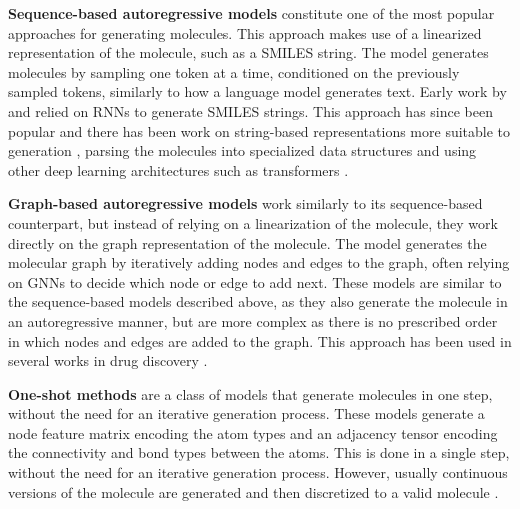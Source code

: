 \textbf{Sequence-based autoregressive models} constitute one of the most popular approaches for
generating molecules. This approach makes use of a linearized representation of the molecule, such
as a SMILES string. The model generates molecules by sampling one token at a time,
conditioned on the previously sampled tokens, similarly to how a language model generates text.
Early work by \citep{seglerGeneratingFocusedMolecule2018} and
\citep{gomez-bombarelliAutomaticChemicalDesign2018} relied on \acp{RNN} to
generate SMILES strings. This approach has since been popular and there has been work on
string-based representations more suitable to generation
\citep{oboyleDeepSMILESAdaptationSMILES2018,krennSelfReferencingEmbeddedStrings2020,noutahiGottaBeSAFE2023},
parsing the molecules into specialized data structures
\citep{kusnerGrammarVariationalAutoencoder2017,jinJunctionTreeVariational2018} and using other deep
learning architectures such as transformers
\citep{vaswaniAttentionAllYou2017,noutahiGottaBeSAFE2023,schwallerMolecularTransformerModel2019,bagalMolGPTMolecularGeneration2022,mazuzMoleculeGenerationUsing2023}.

\textbf{Graph-based autoregressive models} work similarly to its sequence-based counterpart, but
instead of relying on a linearization of the molecule, they work directly on the graph
representation of the molecule. The model generates the molecular graph by iteratively adding nodes
and edges to the graph, often relying on \acp{GNN} to decide which node or edge to add
next. These models are similar to the sequence-based models described above, as they also generate
the molecule in an autoregressive manner, but are more complex as there is no prescribed order in
which nodes and edges are added to the graph. This approach has been used in several works in drug
discovery
\citep{liuConstrainedGraphVariational2018,liLearningDeepGenerative2018,youGraphConvolutionalPolicy2019,cohen-karlikOvercomingOrderAutoregressive2024}.

\textbf{One-shot methods} are a class of models that generate molecules in one step, without the
need for an iterative generation process. These models generate a node feature
matrix encoding the atom types and an adjacency tensor encoding the connectivity and bond types
between the atoms. This is done in a single step, without the need for an iterative generation
process. However, usually continuous versions of the molecule are generated and then discretized to
a valid molecule \citep{decaoMolGANImplicitGenerative2018,madhawaGraphNVPInvertibleFlow2019}.

